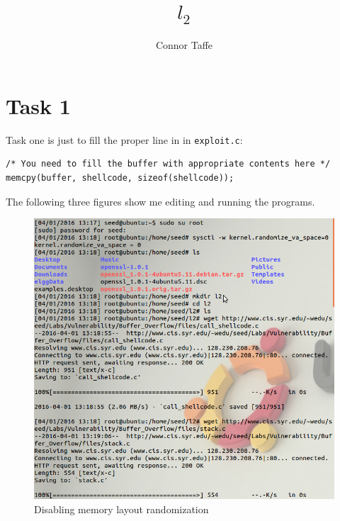 \documentclass{article}
\title{$l_{2}$}
\author{Connor Taffe}
\begin{document}
  \maketitle

  \section{Task 1}

  Task one is just to fill the proper line in in {\tt exploit.c}:

  \begin{verbatim}
/* You need to fill the buffer with appropriate contents here */
memcpy(buffer, shellcode, sizeof(shellcode));
  \end{verbatim}

  The following three figures show me editing and running the programs.

  \begin{figure}
    \centering
    \includegraphics[width=\textwidth]{ss/1.png}
    \caption{Disabling memory layout randomization}
  \end{figure}
\end{document}
